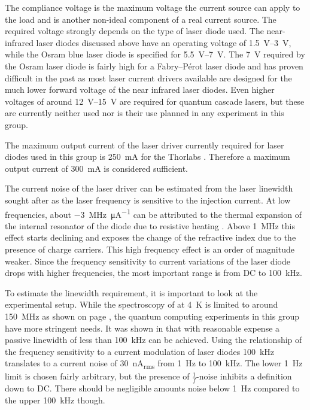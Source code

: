 The compliance voltage is the maximum voltage the current source can apply to the load and is another non-ideal component of a real current source. The required voltage strongly depends on the type of laser diode used. The near-infrared laser diodes discussed above have an operating voltage of \qtyrange{1.5}{3}{\V}, while the Osram  blue laser diode is specified for \qtyrange{5.5}{7}{\V}. The \qty{7}{\V} required by the Osram laser diode is fairly high for a Fabry–Pérot laser diode and has proven difficult in the past \cite{thesis_baus} as most laser current drivers available are designed for the much lower forward voltage of the near infrared laser diodes. Even higher voltages of around \qtyrange{12}{15}{\V} are required for quantum cascade lasers, but these are currently neither used nor is their use planned in any experiment in this group.

The maximum output current of the laser driver currently required for laser diodes used in this group is \qty{250}{\mA} for the Thorlabs  \cite{datasheet_thorlabs_780nm}. Therefore a maximum output current of \qty{300}{\mA} is considered sufficient.

The current noise of the laser driver can be estimated from the laser linewidth sought after as the laser frequency is sensitive to the injection current. At low frequencies, about \qty[per-mode=symbol]{-3}{\MHz \per \micro \A} can be attributed to the thermal expansion of the internal resonator of the diode due to resistive heating \cite{diodelaser_modulation}. Above \qty{1}{\MHz} this effect starts declining and exposes the change of the refractive index due to the presence of charge carriers. This high frequency effect is an order of magnitude weaker. Since the frequency sensitivity to current variations of the laser diode drops with higher frequencies, the most important range is from DC to \qty{100}{\kHz}.

To estimate the linewidth requirement, it is important to look at the experimental setup. While the spectroscopy of  at \qty{4}{\K} is limited to around \qty{150}{\MHz}  as shown on page \pageref{eqn:doppler_broadening}, the quantum computing experiments in this group have more stringent needs. It was shown in \cite{ecdl_stability, ecdl_silicone_housing,ecdl_linewidth_scholten} that with reasonable expense a passive linewidth of less than \qty{100}{\kHz} can be achieved. Using the relationship of the frequency sensitivity to a current modulation of laser diodes \qty{100}{\kHz} translates to a current noise of \qty{30}{\nA_{rms}} from \qty{1}{\Hz} to \qty{100}{\kHz}. The lower \qty{1}{\Hz} limit is chosen fairly arbitrary, but the presence of $\frac 1 f$-noise inhibits a definition down to DC. There should be negligible amounts noise below \qty{1}{\Hz} compared to the upper \qty{100}{\kHz} though.

